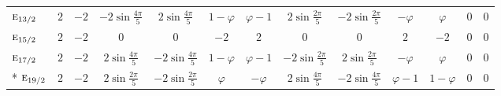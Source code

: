 \documentclass[10pt,a4paper]{article}
\numberwithin{equation}{section}
\newcommand{\irr}[1]{\text{\normalfont\scshape #1}}
\newcommand{\goldenratio}{\varphi}
\begin{document}
{{\begin{longtable}{@{}lcccccccccccc@{}}
$\irr{e}_{13/2}$ & $2$ & $-2$ & $-2\sin\tfrac{4\pi}{5}$ & $2\sin\tfrac{4\pi}{5}$ & $1 - \goldenratio{}$ & $\goldenratio - 1$ & $2\sin\tfrac{2\pi}{5}$ & $-2\sin\tfrac{2\pi}{5}$ & $-\goldenratio{}$ & $\goldenratio{}$ & $0$ & $0$\\
$\irr{e}_{15/2}$ & $2$ & $-2$ & $0$ & $0$ & $-2$ & $2$ & $0$ & $0$ & $2$ & $-2$ & $0$ & $0$\\
$\irr{e}_{17/2}$ & $2$ & $-2$ & $2\sin\tfrac{4\pi}{5}$ & $-2\sin\tfrac{4\pi}{5}$ & $1 - \goldenratio{}$ & $\goldenratio - 1$ & $-2\sin\tfrac{2\pi}{5}$ & $2\sin\tfrac{2\pi}{5}$ & $-\goldenratio{}$ & $\goldenratio{}$ & $0$ & $0$\\*
$\irr{e}_{19/2}$ & $2$ & $-2$ & $2\sin\tfrac{2\pi}{5}$ & $-2\sin\tfrac{2\pi}{5}$ & $\goldenratio{}$ & $-\goldenratio{}$ & $2\sin\tfrac{4\pi}{5}$ & $-2\sin\tfrac{4\pi}{5}$ & $\goldenratio - 1$ & $1 - \goldenratio{}$ & $0$ & $0$\\
\bottomrule\end{longtable}}}
\end{document}
